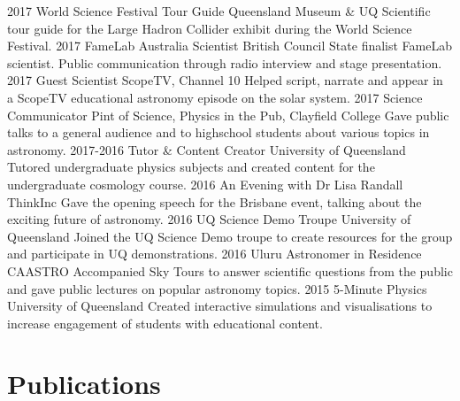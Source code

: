 \documentclass[]{friggeri-cv} %
\begin{document}
\begin{entrylist}
\entry
{2017}
{World Science Festival Tour Guide}
{Queensland Museum \& UQ}
{Scientific tour guide for the Large Hadron Collider exhibit during the World Science Festival.}
\entry
{2017}
{FameLab Australia Scientist}
{British Council}
{State finalist FameLab scientist. Public communication through radio interview and stage presentation.}
\entry
{2017}
{Guest Scientist}
{ScopeTV, Channel 10}
{Helped script, narrate and appear in a ScopeTV educational astronomy episode on the solar system.}
\entry
{2017}
{Science Communicator}
{Pint of Science, Physics in the Pub, Clayfield College}
{Gave public talks to a general audience and to highschool students about various topics in astronomy.}
\entry
{2017-2016}
{Tutor \& Content Creator}
{University of Queensland}
{Tutored undergraduate physics subjects and created content for the undergraduate cosmology course.}
%
%
\entry
{2016}
{An Evening with Dr Lisa Randall}
{ThinkInc}
{Gave the opening speech for the Brisbane event, talking about the exciting future of astronomy.}
%
\entry
{2016}
{UQ Science Demo Troupe}
{University of Queensland}
{Joined the UQ Science Demo troupe to create resources for the group and participate in UQ demonstrations.}
%
\entry
{2016}
{Uluru Astronomer in Residence}
{CAASTRO}
{Accompanied Sky Tours to answer scientific questions from the public and gave public lectures on popular astronomy topics.}
%
\entry
{2015}
{5-Minute Physics}
{University of Queensland}
{Created interactive simulations and visualisations to increase engagement of students with educational content.}
\end{entrylist}

\newpage

\section{Publications}


\begin{refsection}
    \nocite{*}
    \printbibliography[heading=none, keyword={primary}]
\end{refsection}
\vspace{5mm}
\begin{refsection}
    \nocite{*}
    \printbibliography[heading=none, keyword={secondary}]
\end{refsection}
\end{document}
